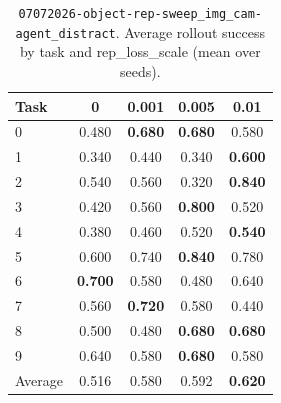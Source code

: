 \begin{table}
\caption{\texttt{07072026-object-rep-sweep\_img\_cam-agent\_distract}. Average rollout success by task and rep\_loss\_scale (mean over seeds).}
\label{tab:07072026_object_rep_sweep_img_cam_agent_distract_rep_loss_success}
\begin{tabular}{lcccc}
\toprule
Task & 0 & 0.001 & 0.005 & 0.01 \\
\midrule
0 & 0.480 & \textbf{0.680} & \textbf{0.680} & 0.580 \\
1 & 0.340 & 0.440 & 0.340 & \textbf{0.600} \\
2 & 0.540 & 0.560 & 0.320 & \textbf{0.840} \\
3 & 0.420 & 0.560 & \textbf{0.800} & 0.520 \\
4 & 0.380 & 0.460 & 0.520 & \textbf{0.540} \\
5 & 0.600 & 0.740 & \textbf{0.840} & 0.780 \\
6 & \textbf{0.700} & 0.580 & 0.480 & 0.640 \\
7 & 0.560 & \textbf{0.720} & 0.580 & 0.440 \\
8 & 0.500 & 0.480 & \textbf{0.680} & \textbf{0.680} \\
9 & 0.640 & 0.580 & \textbf{0.680} & 0.580 \\
\midrule
Average & 0.516 & 0.580 & 0.592 & \textbf{0.620} \\
\bottomrule
\end{tabular}
\end{table}



